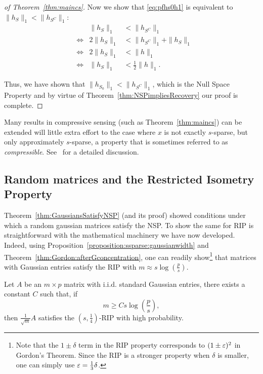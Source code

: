 \begin{proof}[of Theorem~\ref{thm:maincs}]
Now we show that \eqref{eq:pfhs0h1} is equivalent to $\|h_{S}\|_1 < \|h_{S^C}\|_1$:
\begin{align*}
& & \|h_S\|_1 & < \|h_{S^C}\|_1 \\
& \Leftrightarrow & 2\|h_S\|_1 & < \|h_{S^C}\|_1 + \|h_S\|_1 \\
& \Leftrightarrow & 2\|h_S\|_1 & < \|h\|_1 \\
& \Leftrightarrow & \|h_S\|_1 & < \frac{1}{2} \|h\|_1.
\end{align*}

Thus, we have shown that $\|h_{S_0}\|_1 < \|h_{S^C}\|_1$, which is the Null Space Property and by virtue of Theorem~\ref{thm:NSPimpliesRecovery} our proof is complete.

\end{proof}

Many results in compressive sensing (such as Theorem~\ref{thm:maincs}) can be extended will little extra effort to the case where $x$ is not exactly $s$-sparse, but only approximately $s$-sparse, a property that is sometimes referred to as {\em compressible}. See~\cite{CP08,FoucartRauhut_CSbook} for a detailed discussion.



\subsection{Random matrices and the Restricted Isometry Property}

Theorem~\ref{thm:GaussiansSatisfyNSP} (and its proof) showed conditions under which a random gaussian matrices satisfy the NSP. To show the same for RIP is straightforward with the mathematical machinery we have now developed. 
Indeed,
using Proposition~\ref{proposition:ssparse:gaussianwidth} and Theorem~\ref{thm:Gordon:afterGconcentration}, one can readily show\footnote{Note that the $1\pm \delta$ term in the RIP property corresponds to $(1\pm\varepsilon)^2$ in Gordon's Theorem. Since the RIP is a stronger property when $\delta$ is smaller, one can simply use $\varepsilon = \frac13 \delta$.} that matrices with Gaussian entries satisfy the RIP with $m \approx s \log\left( \frac{p}{s} \right)$.

\begin{theorem}\label{thm:RIPmatricesGaussianEntries}
 Let $A$ be an $m\times p$ matrix with i.i.d. standard Gaussian entries, there exists a constant $C$ such that, if
 \begin{equation}\label{condgauss}
  m \geq Cs\log\left(\frac{p}s\right),
 \end{equation}
 then $\frac1{\sqrt{m}}A$ satisfies the $\left(s,\frac14\right)$-RIP with high probability. 
\end{theorem}

